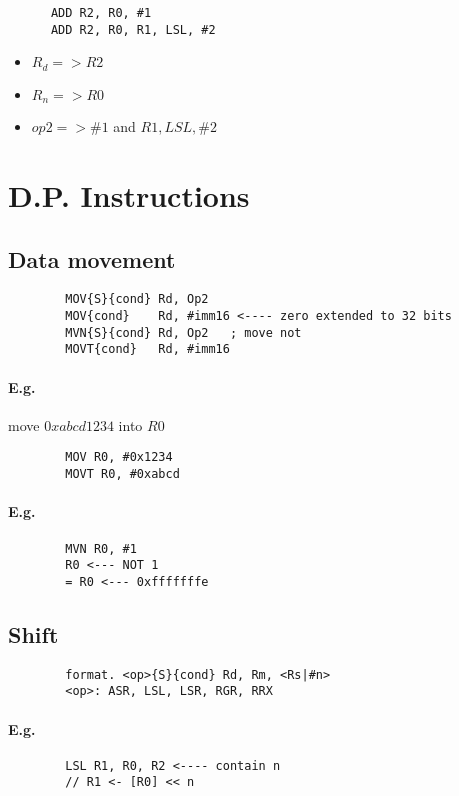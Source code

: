     \begin{lstlisting}
      ADD R2, R0, #1
      ADD R2, R0, R1, LSL, #2
    \end{lstlisting}
    \begin{itemize}
      \item $R_d => R2$
      \item $R_n => R0$
      \item $op2 => \#1$ and $R1, LSL, \#2$
    \end{itemize}

  \section{D.P. Instructions}
    \subsection{Data movement}
      \begin{lstlisting}
        MOV{S}{cond} Rd, Op2
        MOV{cond}    Rd, #imm16 <---- zero extended to 32 bits
        MVN{S}{cond} Rd, Op2   ; move not
        MOVT{cond}   Rd, #imm16
      \end{lstlisting}
      \paragraph{E.g.} move $0xabcd1234$ into $R0$
      \begin{lstlisting}
        MOV R0, #0x1234
        MOVT R0, #0xabcd
      \end{lstlisting}
      \paragraph{E.g.}
      \begin{lstlisting}
        MVN R0, #1
        R0 <--- NOT 1
        = R0 <--- 0xfffffffe
      \end{lstlisting}

    \subsection{Shift}
      \begin{lstlisting}
        format. <op>{S}{cond} Rd, Rm, <Rs|#n>
        <op>: ASR, LSL, LSR, RGR, RRX
      \end{lstlisting}
      \paragraph{E.g.}
      \begin{lstlisting}
        LSL R1, R0, R2 <---- contain n
        // R1 <- [R0] << n
      \end{lstlisting}

